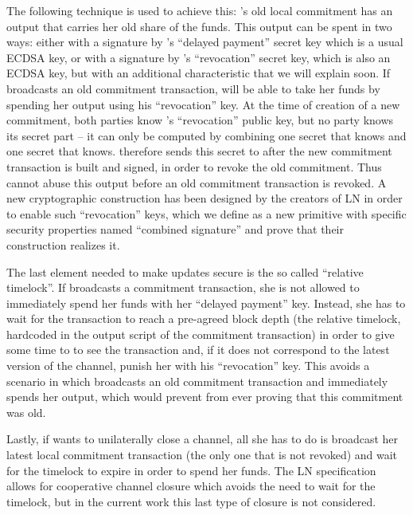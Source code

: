     The following technique is used to achieve this: \alice's old local
    commitment has an output that carries her old share of the funds. This
    output can be spent in two ways: either with a signature by \alice's
    ``delayed payment'' secret key which is a usual ECDSA key, or with a
    signature by \bob's ``revocation'' secret key, which is also an ECDSA key,
    but with an additional characteristic that we will explain soon. If \alice{}
    broadcasts an old commitment transaction, \bob{} will be able to take her
    funds by spending her output using his ``revocation'' key.  At the time of
    creation of a new commitment, both parties know \bob's ``revocation'' public
    key, but no party knows its secret part -- it can only be computed by
    combining one secret that \alice{} knows and one secret that \bob{} knows.
    \alice{} therefore sends this secret to \bob{} after the new commitment
    transaction is built and signed, in order to revoke the old commitment. Thus
    \bob{} cannot abuse this output before an old commitment transaction is
    revoked. A new cryptographic construction has been designed by the creators
    of LN in order to enable such ``revocation'' keys, which we define as a new
    primitive with specific security properties named ``combined signature'' and
    prove that their construction realizes it.

    The last element needed to make updates secure is the so called ``relative
    timelock''. If \alice{} broadcasts a commitment transaction, she is not
    allowed to immediately spend her funds with her ``delayed payment'' key.
    Instead, she has to wait for the transaction to reach a pre-agreed block
    depth (the relative timelock, hardcoded in the output script of the
    commitment transaction) in order to give some time to \bob{} to see the
    transaction and, if it does not correspond to the latest version of the
    channel, punish her with his ``revocation'' key. This avoids a scenario in
    which \alice{} broadcasts an old commitment transaction and immediately
    spends her output, which would prevent \bob{} from ever proving that this
    commitment was old.

    Lastly, if \alice{} wants to unilaterally close a channel, all she has to do
    is broadcast her latest local commitment transaction (the only one that is
    not revoked) and wait for the timelock to expire in order to spend her
    funds. The LN specification allows for cooperative channel closure which
    avoids the need to wait for the timelock, but in the current work
    this last type of closure is not considered.

